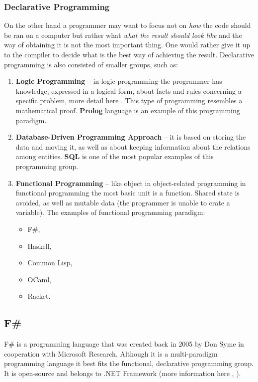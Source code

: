     \subsubsection{Declarative Programming}
    On the other hand a programmer may want to focus not on \textit{how} the code should be ran on a computer but rather what \textit{what the result should look like} and the way of obtaining it is not the most important thing. One would rather give it up to the compiler to decide what is the best way of achieving the result. Declarative programming is also consisted of smaller groups, such as:
    \begin{enumerate}
        \item \textbf{Logic Programming} -- in logic programming the programmer has knowledge, expressed in a logical form, about facts and rules concerning a specific problem, more detail here \cite{logicProgramming}. This type of programming resembles a mathematical proof. \textbf{Prolog} language is an example of this programming paradigm.
        
        \item \textbf{Database-Driven Programming Approach} -- it is based on storing the data and moving it, as well as about keeping information about the relations among entities. \textbf{SQL} is one of the most popular examples of this programming group.
        
        \item \textbf{Functional Programming} -- like object in object-related programming in functional programming the most basic unit is a function. Shared state is avoided, as well as mutable data (the programmer is unable to crate a variable). The examples of functional programming paradigm:
            \begin{itemize}
                \item F\#,
                \item Haskell,
                \item Common Lisp,
                \item OCaml,
                \item Racket.
            \end{itemize}
    \end{enumerate}

\subsection{F\#}
    F\# is a programming language that was created back in 2005 by Don Syme in cooperation with Microsoft Research. Although it is a multi-paradigm programming language it best fits the functional, declarative programming group. It is open-source and belongs to .NET Framework (more information here \cite{WhatIsFSharp},  \cite{FSharpWiki}).
    
